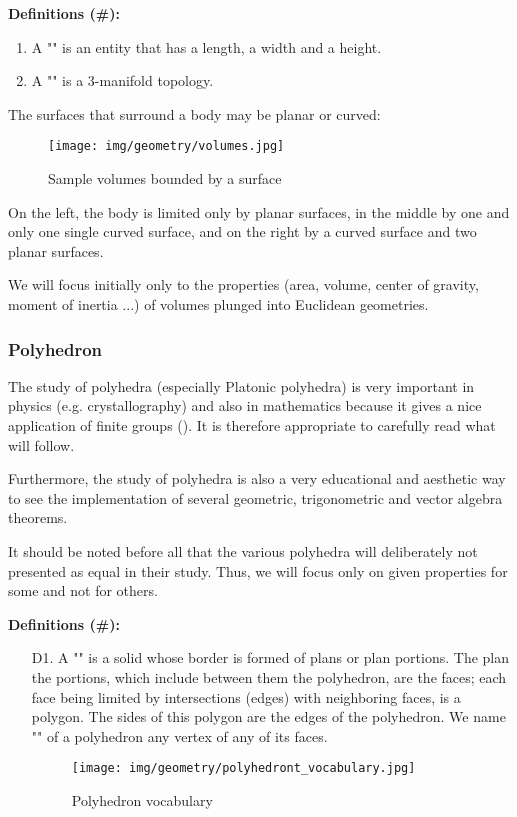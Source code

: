 {	\textbf{Definitions (\#\mydef):}
	\begin{enumerate}
		\item A "" is an entity that has a length, a width and a height.
		
		\item A "" is a 3-manifold topology.
	\end{enumerate}
	The surfaces that surround a body may be planar or curved:
	\begin{figure}[H]
		\centering
		\texttt{[image: img/geometry/volumes.jpg]}
		\caption{Sample volumes bounded by a surface}
	\end{figure}
	On the left, the body is limited only by planar surfaces, in the middle by one and only one single curved surface, and on the right by a curved surface and two planar surfaces.
	\begin{tcolorbox}[title=Remark,colframe=black,arc=10pt]
	We will focus initially only to the properties (area, volume, center of gravity, moment of inertia ...) of volumes plunged into Euclidean geometries.
	\end{tcolorbox}	

	\pagebreak
	\subsubsection{Polyhedron}
	The study of polyhedra (especially Platonic polyhedra) is very important in physics (e.g. crystallography) and also in mathematics because it gives a nice application of finite groups (). It is therefore appropriate to carefully read what will follow.
	
	Furthermore, the study of polyhedra is also a very educational and aesthetic way to see the implementation of several geometric, trigonometric and vector algebra theorems.
	
	It should be noted before all that the various polyhedra will deliberately not presented as equal in their study. Thus, we will focus only on given properties for some and not for others.
	
	\textbf{Definitions (\#\mydef):}
	\begin{enumerate}
		\item[D1.] A "" is a solid whose border is formed of plans or plan portions. The plan the portions, which include between them the polyhedron, are the faces; each face being limited by intersections (edges) with neighboring faces, is a polygon. The sides of this polygon are the edges of the polyhedron. We name "" of a polyhedron any vertex of any of its faces.
		\begin{figure}[H]
			\centering
			\texttt{[image: img/geometry/polyhedront\_vocabulary.jpg]}
			\caption{Polyhedron vocabulary}
		\end{figure}
		

\end{enumerate}}
